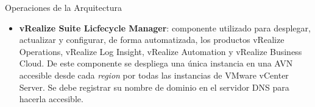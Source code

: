 \begin{subsection}{Operaciones de la Arquitectura}
\begin{itemize}
        \item \textbf{vRealize Suite Licfecycle Manager}: componente utilizado para desplegar, actualizar y configurar, de forma automatizada, los productos vRealize Operations, vRealize Log Insight, vRealize Automation y vRealize Business Cloud. De este componente se despliega una única instancia en una AVN accesible desde cada \textit{region} por todas las instancias de VMware vCenter Server. Se debe registrar su nombre de dominio en el servidor DNS para hacerla accesible.
        
    
    
    \end{itemize}
    
\end{subsection}
